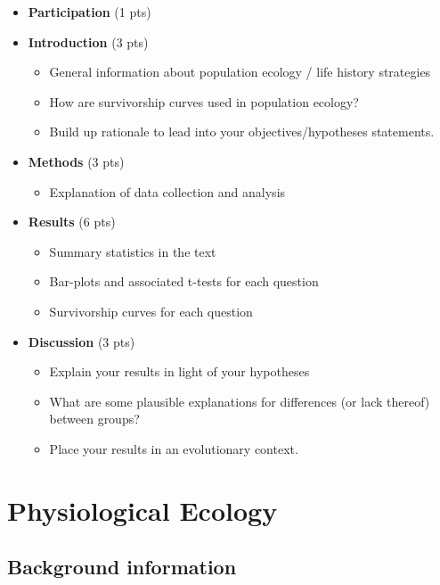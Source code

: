 \documentclass[]{krantz}
\providecommand{\tightlist}{%
  \setlength{\itemsep}{0pt}\setlength{\parskip}{0pt}}
\theoremstyle{definition}
\theoremstyle{definition}
\theoremstyle{definition}
\theoremstyle{remark}
\begin{document}
\begin{itemize}
\item
  \textbf{Participation} (1 pts)
\item
  \textbf{Introduction} (3 pts)

  \begin{itemize}
  \tightlist
  \item
    General information about population ecology / life history
    strategies
  \item
    How are survivorship curves used in population ecology?
  \item
    Build up rationale to lead into your objectives/hypotheses
    statements.
  \end{itemize}
\item
  \textbf{Methods} (3 pts)

  \begin{itemize}
  \tightlist
  \item
    Explanation of data collection and analysis
  \end{itemize}
\item
  \textbf{Results} (6 pts)

  \begin{itemize}
  \tightlist
  \item
    Summary statistics in the text
  \item
    Bar-plots and associated t-tests for each question
  \item
    Survivorship curves for each question
  \end{itemize}
\item
  \textbf{Discussion} (3 pts)

  \begin{itemize}
  \tightlist
  \item
    Explain your results in light of your hypotheses
  \item
    What are some plausible explanations for differences (or lack
    thereof) between groups?
  \item
    Place your results in an evolutionary context.
  \end{itemize}
\end{itemize}

\chapter{Physiological Ecology}\label{physiological-ecology}

\section{Background information}\label{background-information-1}
\end{document}
